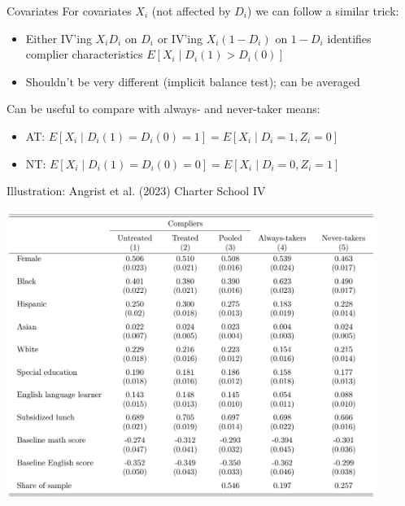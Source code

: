 \documentclass{beamer}
\begin{document}
\vspace{-0.5cm}
\begin{frame}{Covariates}
For covariates $X_i$ (not affected by $D_i$) we can follow a similar trick:
\begin{itemize}
\item Either IV'ing $X_iD_i$ on $D_i$ or IV'ing $X_i(1-D_i)$ on $1-D_i$ identifies complier characteristics $E[X_i\mid D_i(1)>D_i(0)]$\smallskip
\item Shouldn't be very different (implicit balance test); can be averaged
\end{itemize}\bigskip\pause{}
Can be useful to compare with always- and never-taker means:
\begin{itemize}
\item AT: $E[X_i\mid D_i(1)=D_i(0)=1]=E[X_i\mid D_i=1,Z_i=0]$\smallskip
\item NT: $E[X_i\mid D_i(1)=D_i(0)=0]=E[X_i\mid D_i=0,Z_i=1]$
\end{itemize}
\end{frame}

\begin{frame}{Illustration: Angrist et al. (2023) Charter School IV}

\vspace{-0.2cm}
\begin{center}
	\includegraphics[width=0.9\textwidth]{./lecture_includes/hoee_characteristics.png}
\end{center}

\end{frame}
\end{document}
